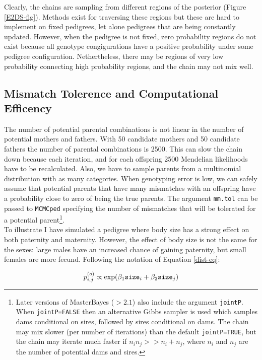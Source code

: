 \documentclass{article}
\begin{document}
Clearly, the chains are sampling from different regions of the posterior (Figure \ref{E2DS-fig}).  Methods exist for traversing these regions \citep{Sheehan.2000, Lange.2002} but these are hard to implement on fixed pedigrees, let alone pedigrees that are being constantly updated.  However, when the pedigree is not fixed, zero probability regions do not exist because all genotype congigurations have a positive probability under some pedigree configuration.  Nethertheless, there may be regions of very low probability connecting high probability regions, and the chain may not mix well.  

\subsection{Mismatch Tolerence and Computational Efficency}

The number of potential parental combinations is not linear in the number of potential mothers and fathers.  With 50 candidate mothers and 50 candidate fathers the number of parental combinations is 2500.  This can slow the chain down because each iteration, and for each offspring 2500 Mendelian likelihoods have to be recalculated.  Also, we have to sample parents from a multinomial distribution with as many categories.  When genotyping error is low, we can safely assume that potential parents that have many mismatches with an offspring have a probability close to zero of being the true parents.  The argument \texttt{mm.tol} can be passed to \texttt{MCMCped} specifying the number of mismatches that will be tolerated for a potential parent\footnote{Later versions of MasterBayes ($>2.1$) also include the argument \texttt{jointP}. When \texttt{jointP=FALSE} then an alternative Gibbs sampler is used which samples dams conditional on sires, followed by sires conditional on dams.  The chain may mix slower (per number of iterations) than the default \texttt{jointP=TRUE}, but the chain may iterate much faster if $n_{i}n_{j}>>n_{i}+n_{j}$, where $n_{i}$ and $n_{j}$ are the number of potential dams and sires.}.\\

To illustrate I have simulated a pedigree where body size has a strong effect on both paternity and maternity.  However, the effect of body size is not the same for the sexes: large males have an increased chance of gaining paternity, but small females are more fecund. Following the notation of Equation \ref{dist-eq}:

\begin{equation}
p^{(o)}_{i,j} \propto \textrm{exp}(\beta_{1}\textrm{\texttt{size}}_{i} + \beta_{2}\textrm{\texttt{size}}_{j})
\end{equation}
\end{document}
